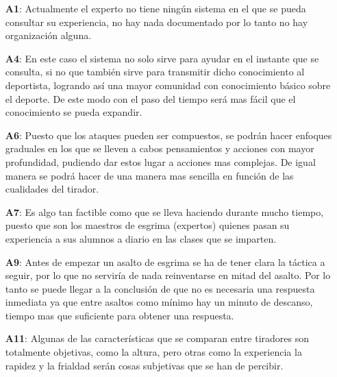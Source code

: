 \begin{enumerate}
  \item[\textbf{A1}:] Actualmente el experto no tiene ningún sistema en el que
     se pueda consultar su experiencia, no hay nada documentado por lo tanto no
     hay organización alguna.
  \item[\textbf{A4}:] En este caso el sistema no solo sirve para ayudar en el
     instante que se consulta, si no que también sirve para transmitir dicho
     conocimiento al deportista, logrando así una mayor comunidad con
     conocimiento básico sobre el deporte. De este modo con el paso del tiempo
     será mas fácil que el conocimiento se pueda expandir.
  \item[\textbf{A6}:] Puesto que los ataques pueden ser compuestos, se podrán
     hacer enfoques graduales en los que se lleven a cabos pensamientos y
     acciones con mayor profundidad, pudiendo dar estos lugar a acciones mas
     complejas. De igual manera se podrá hacer de una manera mas sencilla
     en función de las cualidades del tirador.
  \item[\textbf{A7}:] Es algo tan factible como que se lleva haciendo durante
     mucho tiempo, puesto que son los maestros de esgrima (expertos) quienes
     pasan su experiencia a sus alumnos a diario en las clases que se imparten.
  \item[\textbf{A9}:] Antes de empezar un asalto de esgrima se ha de tener
     clara la táctica a seguir, por lo que no serviría de nada reinventarse
     en mitad del asalto. Por lo tanto se puede llegar a la conclusión de que
     no es necesaria una respuesta inmediata ya que entre asaltos como mínimo
     hay un minuto de descanso, tiempo mas que suficiente para obtener una respuesta.
  \item[\textbf{A11}:] Algunas de las características que se comparan entre
     tiradores son totalmente objetivas, como la altura, pero otras como la experiencia
     la rapidez y la frialdad serán cosas subjetivas que se han de percibir.
\end{enumerate}

